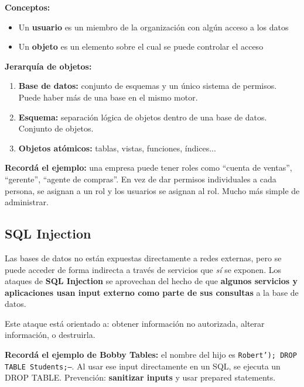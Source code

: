 \documentclass[11pt, a4paper]{article}
\begin{document}
\textbf{Conceptos:}
\begin{itemize}
	\item Un \textbf{usuario} es un miembro de la organización con algún acceso a los datos
	\item Un \textbf{objeto} es un elemento sobre el cual se puede controlar el acceso
\end{itemize}

\textbf{Jerarquía de objetos:}
\begin{enumerate}
	\item \textbf{Base de datos:} conjunto de esquemas y un único sistema de permisos. Puede haber más de una base en el mismo motor.
	\item \textbf{Esquema:} separación lógica de objetos dentro de una base de datos. Conjunto de objetos.
	\item \textbf{Objetos atómicos:} tablas, vistas, funciones, índices...
\end{enumerate}

\begin{recallbox}
	\textbf{Recordá el ejemplo:} una empresa puede tener roles como ``cuenta de ventas'', ``gerente'', ``agente de compras''. En vez de dar permisos individuales a cada persona, se asignan a un rol y los usuarios se asignan al rol. Mucho más simple de administrar.
\end{recallbox}

\subsection{SQL Injection}

Las bases de datos no están expuestas directamente a redes externas, pero se puede acceder de forma indirecta a través de servicios que \textit{sí} se exponen. Los ataques de \textbf{SQL Injection} se aprovechan del hecho de que \textbf{algunos servicios y aplicaciones usan input externo como parte de sus consultas} a la base de datos.

Este ataque está orientado a: obtener información no autorizada, alterar información, o destruirla.

\begin{recallbox}
	\textbf{Recordá el ejemplo de Bobby Tables:} el nombre del hijo es \texttt{Robert'); DROP TABLE Students;--}. Al usar ese input directamente en un SQL, se ejecuta un DROP TABLE. Prevención: \textbf{sanitizar inputs} y usar prepared statements.
\end{recallbox}
\end{document}
